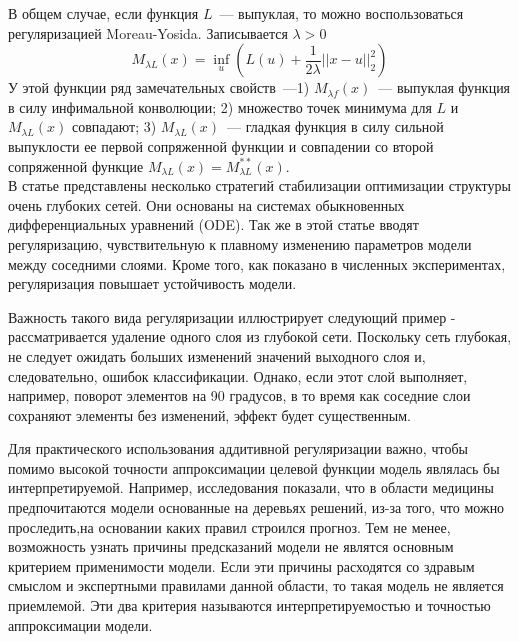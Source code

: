 \documentclass[12pt, twoside]{article}
\newenvironment{comment}{}{}
\begin{document}
В общем случае, если функция $L$~--- выпуклая, то можно воспользоваться регуляризацией Moreau-Yosida. Записывается  $\lambda > 0$
\begin{equation}
M_{\lambda L}(x) = \underset{u}\inf(L(u) + \frac{1}{2\lambda}||x - u||_2^2) 
\end{equation}
У этой функции ряд замечательных свойств~---1) $M_{\lambda f}(x)$~--- выпуклая функция в силу инфимальной конволюции; 2) множество точек минимума для $L$ и $M_{\lambda L}(x)$ совпадают; 3) $M_{\lambda L}(x)$~--- гладкая функция в силу сильной выпуклости ее первой сопряженной функции и совпадении со второй сопряженной функцие $M_{\lambda L}(x) = M_{\lambda L}^{**}(x)$. \\

В статье \cite{haber2017stable} представлены несколько стратегий стабилизации оптимизации структуры очень глубоких сетей. Они основаны на системах обыкновенных дифференциальных уравнений (ODE). Так же в этой статье вводят регуляризацию, чувствительную к плавному изменению параметров модели между соседними слоями. Кроме того, как показано в численных экспериментах, регуляризация повышает устойчивость модели. 

\begin{comment}
    Важность такого вида регуляризации иллюстрирует следующий пример - рассматривается удаление одного слоя из глубокой сети. Поскольку сеть глубокая, не следует ожидать больших изменений значений выходного слоя и, следовательно, ошибок классификации. Однако, если этот слой выполняет, например, поворот элементов на 90 градусов, в то время как соседние слои сохраняют элементы без изменений, эффект будет существенным.
\end{comment}

Для практического использования аддитивной регуляризации важно, чтобы помимо высокой точности аппроксимации целевой функции модель являлась бы интерпретируемой. Например, исследования показали, что в области медицины предпочитаются модели основанные на деревьях решений, из-за того, что можно проследить,на основании каких правил строился прогноз. Тем не менее, возможность узнать причины предсказаний модели не являтся основным критерием применимости модели. Если эти причины  расходятся со здравым смыслом и экспертными правилами данной области, то такая модель не является приемлемой. Эти два критерия называются интерпретируемостью и точностью аппроксимации модели.
\end{document}
